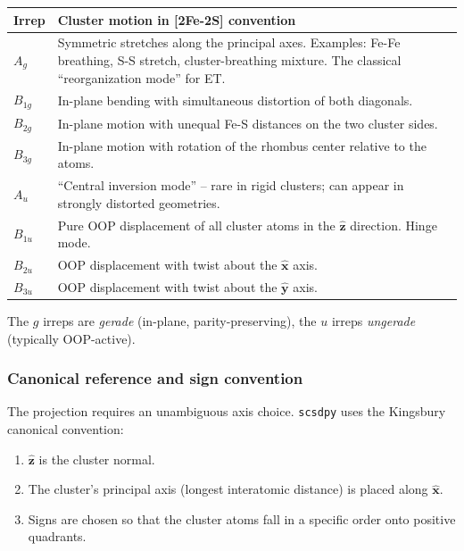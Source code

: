 \documentclass[11pt,a4paper,twoside]{article}
\newcommand{\xhat}{\hat{\mathbf{x}}}
\newcommand{\zhat}{\hat{\mathbf{z}}}
\theoremstyle{remark}
\begin{document}
\begin{center}
\begin{tabular}{lp{8.5cm}}
  \toprule
  \textbf{Irrep} & \textbf{Cluster motion in [2Fe-2S] convention} \\
  \midrule
  $A_g$    & Symmetric stretches along the principal axes.
             Examples: Fe-Fe breathing, S-S stretch,
             cluster-breathing mixture. The classical
             ``reorganization mode'' for ET. \\
  $B_{1g}$ & In-plane bending with simultaneous distortion of
             both diagonals. \\
  $B_{2g}$ & In-plane motion with unequal Fe-S distances on the
             two cluster sides. \\
  $B_{3g}$ & In-plane motion with rotation of the rhombus center
             relative to the atoms. \\
  $A_u$    & ``Central inversion mode'' -- rare in rigid
             clusters; can appear in strongly distorted
             geometries. \\
  $B_{1u}$ & Pure OOP displacement of all cluster atoms in the
             $\hat{\mathbf{z}}$ direction. Hinge mode. \\
  $B_{2u}$ & OOP displacement with twist about the $\hat{\mathbf{x}}$ axis. \\
  $B_{3u}$ & OOP displacement with twist about the $\hat{\mathbf{y}}$ axis. \\
  \bottomrule
\end{tabular}
\end{center}

The $g$ irreps are \emph{gerade} (in-plane, parity-preserving),
the $u$ irreps \emph{ungerade} (typically OOP-active).

\subsubsection*{Canonical reference and sign convention}

The projection requires an unambiguous axis choice. \texttt{scsdpy}
uses the Kingsbury canonical convention:

\begin{enumerate}
  \item $\zhat$ is the cluster normal.
  \item The cluster's principal axis (longest interatomic distance)
        is placed along $\xhat$.
  \item Signs are chosen so that the cluster atoms fall in a specific
        order onto positive quadrants.
\end{enumerate}
\end{document}
